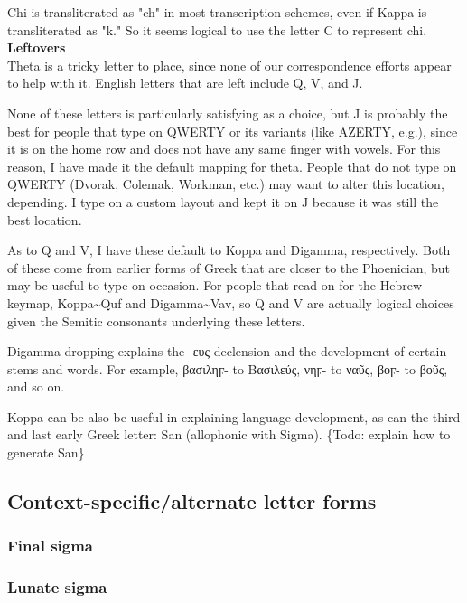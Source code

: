 \documentclass[11pt]{article}
\begin{document}
Chi is transliterated as "ch" in most transcription schemes, even if Kappa is transliterated as "k." So it seems logical to use the letter C to represent chi. \\

\noindent \textbf{Leftovers} \\

Theta is a tricky letter to place, since none of our correspondence efforts appear to help with it. English letters that are left include Q, V, and J.

None of these letters is particularly satisfying as a choice, but J is probably the best for people that type on QWERTY or its variants (like AZERTY, e.g.), since it is on the home row and does not have any same finger with vowels. For this reason, I have made it the default mapping for theta. People that do not type on QWERTY (Dvorak, Colemak, Workman, etc.) may want to alter this location, depending. I type on a custom layout and kept it on J because it was still the best location.

As to Q and V, I have these default to Koppa and Digamma, respectively. Both of these come from earlier forms of Greek that are closer to the Phoenician, but may be useful to type on occasion. For people that read on for the Hebrew keymap, Koppa\textasciitilde{}Quf and Digamma\textasciitilde{}Vav, so Q and V are actually logical choices given the Semitic consonants underlying these letters.

Digamma dropping explains the -ευς declension and the development of certain stems and words. For example, βασιληϝ- to Βασιλεύς, νηϝ- to ναῦς, βοϝ- to βοῦς, and so on.

Koppa can be also be useful in explaining language development, as can the third and last early Greek letter: San (allophonic with Sigma). \{Todo: explain how to generate San\}

\subsection{Context-specific/alternate letter forms}
\label{sec:org54a1dbc}

\subsubsection{Final sigma}
\label{sec:orgbdebd9a}

\subsubsection{Lunate sigma}
\label{sec:orgfc91719}
\end{document}
